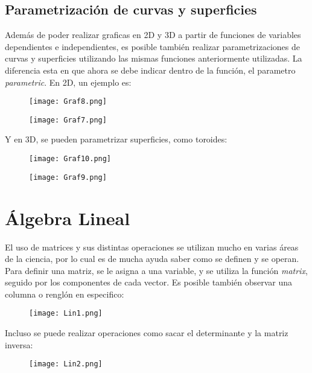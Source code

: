 \documentclass[12pt]{article}
\begin{document}
\subsection{Parametrización de curvas y superficies}
Además de poder realizar graficas en 2D y 3D a partir de funciones de variables dependientes e independientes, es posible también realizar parametrizaciones de curvas y superficies utilizando las mismas funciones anteriormente utilizadas. La diferencia esta en que ahora se debe indicar dentro de la función, el parametro \textit{parametric}. En 2D, un ejemplo es:

\begin{figure}[h!]
    \centering
\texttt{[image: Graf8.png]}
\end{figure}
\begin{figure}[h!]
    \centering
\texttt{[image: Graf7.png]}
\end{figure}

Y en 3D, se pueden parametrizar superficies, como toroides:

\begin{figure}[h!]
    \centering
\texttt{[image: Graf10.png]}
\end{figure}
\begin{figure}[h!]
    \centering
\texttt{[image: Graf9.png]}
\end{figure}

\section{Álgebra Lineal}
El uso de matrices y sus distintas operaciones se utilizan mucho en varias áreas de la ciencia, por lo cual es de mucha ayuda saber como se definen y se operan. Para definir una matriz, se le asigna a una variable, y se utiliza la función \textit{matrix}, seguido por los componentes de cada vector. Es posible también observar una columna o renglón en especifico:

\begin{figure}[h!]
    \centering
\texttt{[image: Lin1.png]}
\end{figure}

Incluso se puede realizar operaciones como sacar el determinante y la matriz inversa:

\begin{figure}[h!]
    \centering
\texttt{[image: Lin2.png]}
\end{figure}
\end{document}
